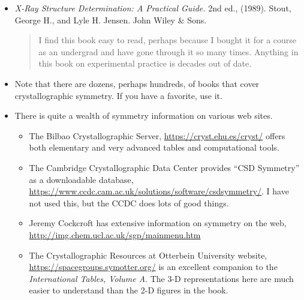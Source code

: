 \begin{itemize}
\item
\textit{X-Ray Structure Determination: A Practical Guide.} 2nd ed., (1989). Stout, George H., and Lyle H. Jensen. John Wiley \& Sons.
\begin{quote}
I find this book easy to read, perhaps because I bought it for a course as an undergrad and have gone through it so many times. 
Anything in this book on experimental practice is  decades out of date.
\end{quote}
\item
Note that there are dozens, perhaps hundreds, of books that cover crystallographic symmetry. If you have a favorite, use it. 
\item 
There is quite a wealth of symmetry information on various web sites. 
\begin{itemize}
\item
The Bilbao Crystallographic Server, \url{https://cryst.ehu.es/cryst/} offers both elementary and very advanced tables and computational tools. 
\item
The Cambridge Crystallographic Data Center provides ``CSD Symmetry'' as a downloadable database, \url{https://www.ccdc.cam.ac.uk/solutions/software/csdsymmetry/}. I have not used this, but the CCDC does lots of good things. 
\item 
Jeremy Cockcroft has extensive information on symmetry on the web,
\url{http://img.chem.ucl.ac.uk/sgp/mainmenu.htm}
\item 
The 
Crystallographic Resources at Otterbein University
website, \url{https://spacegroups.symotter.org/} is an excellent companion to the \textit{International Tables, Volume A}. The 3-D representations here are much easier to understand than the 2-D figures in the book. 
\end{itemize}
\end{itemize}
